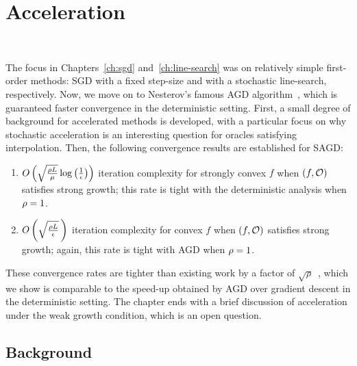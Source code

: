 
\chapter{Acceleration}~\label{ch:acceleration}

The focus in Chapters~\ref{ch:sgd} and~\ref{ch:line-search} was on relatively simple first-order methods: \ac{SGD} with a fixed step-size and with a stochastic line-search, respectively.
Now, we move on to Nesterov's famous \ac{AGD} algorithm~\citep{nesterov2004lectures}, which is guaranteed faster convergence in the deterministic setting. 
First, a small degree of background for accelerated methods is developed, with a particular focus on why stochastic acceleration is an interesting question for oracles satisfying interpolation.
Then, the following convergence results are established for \ac{SAGD}:
\begin{enumerate}
    \item \( O\rbr{\sqrt{\frac{\sgc L}{\mu}} \log \rbr{\inv{\epsilon}}} \) iteration complexity for strongly convex \( f \) when \( \rbr{f, \oracle{}} \) satisfies strong growth; this rate is tight with the deterministic analysis when \( \sgc = 1 \).
    \item \( O\rbr{\sqrt{\frac{\sgc L}{\epsilon}} \,} \) iteration complexity for convex \( f \) when \( \rbr{f, \oracle{}} \) satisfies strong growth; again, this rate is tight with \ac{AGD} when \( \sgc = 1 \).
\end{enumerate}
These convergence rates are tighter than existing work by a factor of \( \sqrt{\rho} \)~\citep[Theorems 1-2]{vaswani2019fast}, which we show is comparable to the speed-up obtained by \ac{AGD} over gradient descent in the deterministic setting.
The chapter ends with a brief discussion of acceleration under the weak growth condition, which is an open question.
\newpage

\section{Background}~\label{sec:agd-background}

